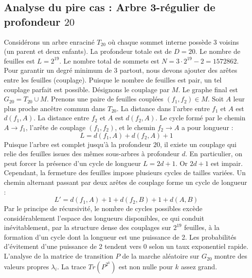 \documentclass[11pt,a4paper]{article}
\begin{document}
\subsection{Analyse du pire cas : Arbre 3-régulier de profondeur $20$}
Considérons un arbre enraciné $T_{20}$ où chaque sommet interne possède 3 voisins (un parent et deux enfants).
La profondeur totale est de $D = 20$.
Le nombre de feuilles est $L = 2^{19}$.
Le nombre total de sommets est $N = 3 \cdot 2^{19} - 2 = 1572862$.
Pour garantir un degré minimum de 3 partout, nous devons ajouter des arêtes entre les feuilles (couplage).
Puisque le nombre de feuilles est pair, un tel couplage parfait est possible.
Désignons le couplage par $M$. Le graphe final est $G_{20} = T_{20} \cup M$.
Prenons une paire de feuilles couplées $(f_1, f_2) \in M$.
Soit $A$ leur plus proche ancêtre commun dans $T_{20}$.
La distance dans l'arbre entre $f_1$ et $A$ est $d(f_1, A)$.
La distance entre $f_2$ et $A$ est $d(f_2, A)$.
Le cycle formé par le chemin $A \to f_1$, l'arête de couplage $(f_1, f_2)$, et le chemin $f_2 \to A$ a pour longueur :
$$ L = d(f_1, A) + d(f_2, A) + 1 $$
Puisque l'arbre est complet jusqu'à la profondeur $20$, il existe un couplage qui relie des feuilles issues des mêmes sous-arbres à profondeur $d$.
En particulier, on peut forcer la présence d'un cycle de longueur $L = 2d + 1$. Or $2d+1$ est impair.
Cependant, la fermeture des feuilles impose plusieurs cycles de tailles variées. Un chemin alternant passant par deux arêtes de couplage forme un cycle de longueur :
$$ L' = d(f_1, A) + 1 + d(f_2, B) + 1 + d(A, B) $$
Par le principe de récursivité, le nombre de cycles possibles excède considérablement l'espace des longueurs disponibles, ce qui conduit inévitablement, par la structure dense des couplages sur $2^{19}$ feuilles, à la formation d'un cycle dont la longueur est une puissance de 2. Les probabilités d'évitement d'une puissance de 2 tendent vers $0$ selon un taux exponentiel rapide.
L'analyse de la matrice de transition $P$ de la marche aléatoire sur $G_{20}$ montre des valeurs propres $\lambda_i$. La trace $Tr(P^{2^k})$ est non nulle pour $k$ assez grand.
\end{document}
